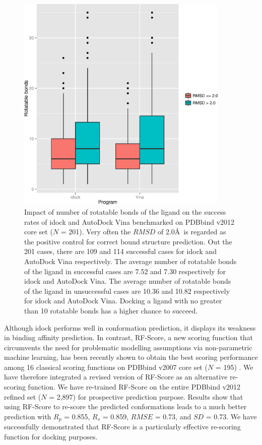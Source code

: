 \begin{figure}
\begin{center}
\includegraphics[width=4in]{../istar/Program-NRB.eps}
\end{center}
\caption{Impact of number of rotatable bonds of the ligand on the success rates of idock and AutoDock Vina benchmarked on PDBbind v2012 core set ($N$ = 201). Very often the $RMSD$ of 2.0\AA\ is regarded as the positive control for correct bound structure prediction. Out the 201 cases, there are 109 and 114 successful cases for idock and AutoDock Vina respectively. The average number of rotatable bonds of the ligand in successful cases are 7.52 and 7.30 respectively for idock and AutoDock Vina. The average number of rotatable bonds of the ligand in unsuccessful cases are 10.36 and 10.82 respectively for idock and AutoDock Vina. Docking a ligand with no greater than 10 rotatable bonds has a higher chance to succeed.}
\label{Program-NRB}
\end{figure}

Although idock performs well in conformation prediction, it displays its weakness in binding affinity prediction. In contrast, RF-Score, a new scoring function that circumvents the need for problematic modelling assumptions via non-parametric machine learning, has been recently shown to obtain the best scoring performance among 16 classical scoring functions on PDBbind v2007 core set ($N$ = 195) \citep{564}. We have therefore integrated a revised version of RF-Score as an alternative re-scoring function. We have re-trained RF-Score on the entire PDBbind v2012 refined set ($N$ = 2,897) for prospective prediction purpose. Results show that using RF-Score to re-score the predicted conformations leads to a much better prediction with $R_p$ = 0.855, $R_s$ = 0.859, $RMSE$ = 0.73, and $SD$ = 0.73. We have successfully demonstrated that RF-Score is a particularly effective re-scoring function for docking purposes.

